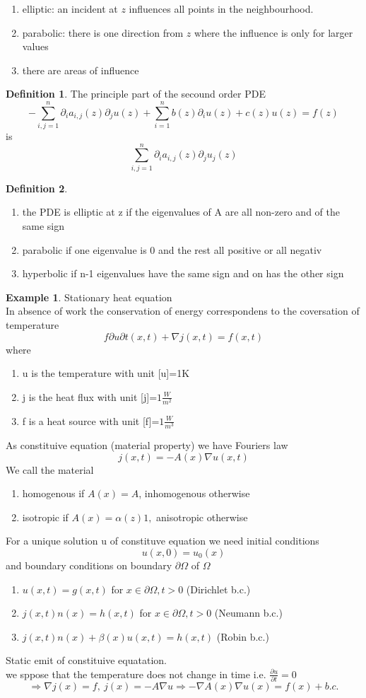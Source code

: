 \documentclass[ngerman]{article}
\theoremstyle{definition}
\newtheorem*{defi}{Definition}
\newtheorem*{exa}{Example}
\theoremstyle{remark}
\newcommand{\f}[2]{\frac{#1}{#2}}							%
\newcommand{\p}{\partial}
\renewcommand{\aa}{\alpha}		%
\newcommand{\bb}{\beta}					%
\newcommand{\OO}{\Omega}
\newcommand{\drw}{\Rightarrow}			%
\newcommand{\tri}{\nabla}
\begin{document}
\begin{enumerate}
\item elliptic: an incident at $z$ influences all points in the neighbourhood.
\item parabolic: there is one direction from $z$ where the influence is only for larger values
\item there are areas of influence
\end{enumerate}
\begin{defi} The principle part of the secound order PDE
  $$-\sum_{i,j=1}^n \p_i a_{i,j}(z)\p_j u(z) + \sum_{i=1}^n b(z)\p_iu(z) + c(z) u(z) = f(z)$$
  is $$\sum_{i,j=1}^n \p_i a_{i,j}(z) \p_j u_j(z)$$
\end{defi}
\begin{defi}
  \begin{enumerate}
  \item the PDE is elliptic at z if the eigenvalues of A are all non-zero and of the same sign
  \item parabolic if one eigenvalue is 0 and the rest all positive or all negativ
  \item hyperbolic if n-1 eigenvalues have the same sign and on has the other sign
  \end{enumerate}
\end{defi}

\begin{exa} Stationary heat equation\\
  In absence of work the conservation of energy correspondens to the coversation of temperature
  $$f{\p u}{\p t}(x,t) + \tri j (x,t)= f(x,t)$$
  where
  \begin{enumerate}
  \item u is the temperature with unit [u]=1K
  \item j is the heat flux with unit [j]=$1\f{W}{m^2}$
  \item f is a heat source with unit [f]=$1\f{W}{m^3}$
  \end{enumerate}
  As constituive equation (material property) we have Fouriers law 
  $$j(x,t)=-A(x)\tri u(x,t)$$
  We call the material 
  \begin{enumerate}
  \item homogenous if $A(x)=A$, inhomogenous otherwise
  \item isotropic if $A(x)= \aa(z)1,$ anisotropic otherwise
  \end{enumerate}
\end{exa}
For a unique solution u of constituve equation we need initial conditions
$$u(x,0)= u_0 (x)$$
and boundary conditions on boundary $\p \OO$ of $\OO$
\begin{enumerate}
\item $u(x,t)= g(x,t)$ for $x \in \p \OO, t>0$ (Dirichlet b.c.)
\item $j(x,t) n(x) = h(x,t)$ for $x \in \p\OO, t>0$ (Neumann b.c.)
\item $j(x,t) n(x) + \bb(x) u(x,t) = h(x,t)$ (Robin b.c.)
\end{enumerate}
Static emit of constituive equatation.\\
we sppose that the temperature does not change in time i.e. $\f{\p u}{\p t}=0$
$$\drw \tri j(x) = f,\ j(x)=-A \tri u \drw -\tri A(x)\tri u(x) = f(x) + b.c.$$
\end{document}
